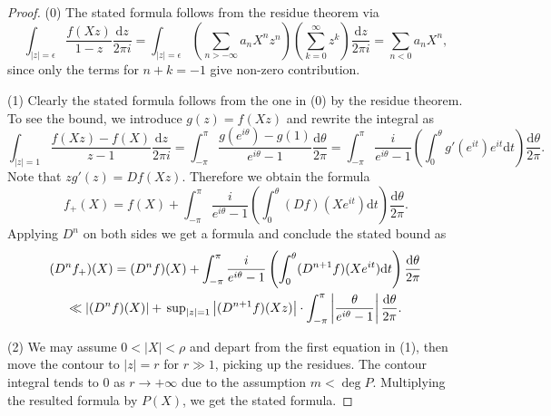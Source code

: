 \documentclass[A4]{amsart}
\numberwithin{equation}{section} \everymath{\displaystyle}
\newcommand{\ud}{\mathrm{d}}
\newcommand{\norm}[1][\cdot]{\lvert #1 \rvert}
\newcommand{\extnorm}[1]{\left\lvert #1 \right\rvert}
\begin{document}
\begin{proof}
	(0) The stated formula follows from the residue theorem via
	$$ \int_{\norm[z]=\epsilon} \frac{f(Xz)}{1-z} \frac{\ud z}{2\pi i} = \int_{\norm[z]=\epsilon} \left( \sum_{n > -\infty} a_n X^n z^n \right) \left( \sum_{k=0}^{\infty} z^k \right) \frac{\ud z}{2\pi i} = \sum_{n < 0} a_n X^n, $$
	since only the terms for $n+k=-1$ give non-zero contribution.

\noindent (1) Clearly the stated formula follows from the one in (0) by the residue theorem. To see the bound, we introduce $g(z) = f(Xz)$ and rewrite the integral as
	$$ \int_{\norm[z]=1} \frac{f(Xz)-f(X)}{z-1} \frac{\ud z}{2\pi i} = \int_{-\pi}^{\pi} \frac{g(e^{i\theta})-g(1)}{e^{i\theta}-1} \frac{\ud \theta}{2\pi} = \int_{-\pi}^{\pi} \frac{i}{e^{i\theta}-1} \left( \int_0^{\theta} g'(e^{it}) e^{it} \ud t \right) \frac{\ud \theta}{2\pi} . $$
	Note that $z g'(z) = Df(Xz)$. Therefore we obtain the formula
	$$ f_+(X) = f(X) + \int_{-\pi}^{\pi} \frac{i}{e^{i\theta}-1} \left( \int_0^{\theta} (Df)(Xe^{it}) \ud t \right) \frac{\ud \theta}{2\pi}. $$
	Applying $D^n$ on both sides we get a formula and conclude the stated bound as
\begin{multline*} 
	(D^n f_+)(X) = (D^n f)(X) + \int_{-\pi}^{\pi} \frac{i}{e^{i\theta}-1} \left( \int_0^{\theta} (D^{n+1}f)(Xe^{it}) \ud t \right) \frac{\ud \theta}{2\pi} \\
	\ll \extnorm{(D^n f)(X)} + \sideset{}{_{\norm[z]=1}} \sup \extnorm{(D^{n+1} f)(Xz)} \cdot \int_{-\pi}^{\pi} \extnorm{\frac{\theta}{e^{i\theta}-1}} \frac{\ud \theta}{2\pi}.
\end{multline*}
	
\noindent (2) We may assume $0 < \norm[X] < \rho$ and depart from the first equation in (1), then move the contour to $\norm[z]=r$ for $r \gg 1$, picking up the residues. The contour integral tends to $0$ as $r \to +\infty$ due to the assumption $m < \deg P$. Multiplying the resulted formula by $P(X)$, we get the stated formula.
\end{proof}
\end{document}
